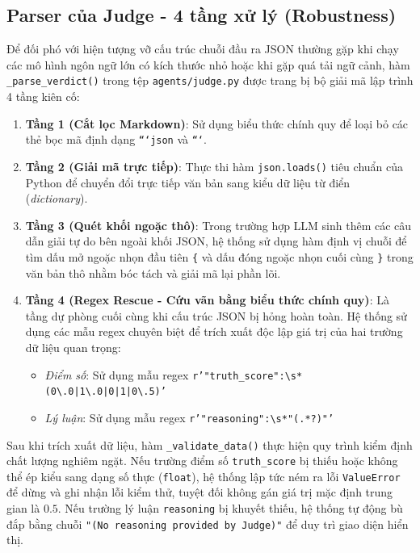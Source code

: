 \documentclass[12pt,a4paper]{report}
\begin{document}
\subsection{Parser của Judge - 4 tầng xử lý (Robustness)}
Để đối phó với hiện tượng vỡ cấu trúc chuỗi đầu ra JSON thường gặp khi chạy các mô hình ngôn ngữ lớn có kích thước nhỏ hoặc khi gặp quá tải ngữ cảnh, hàm \texttt{\_parse\_verdict()} trong tệp \texttt{agents/judge.py} được trang bị bộ giải mã lập trình 4 tầng kiên cố:
\begin{enumerate}
    \item \textbf{Tầng 1 (Cắt lọc Markdown)}: Sử dụng biểu thức chính quy để loại bỏ các thẻ bọc mã định dạng \texttt{```json} và \texttt{```}.
    \item \textbf{Tầng 2 (Giải mã trực tiếp)}: Thực thi hàm \texttt{json.loads()} tiêu chuẩn của Python để chuyển đổi trực tiếp văn bản sang kiểu dữ liệu từ điển (\textit{dictionary}).
    \item \textbf{Tầng 3 (Quét khối ngoặc thô)}: Trong trường hợp LLM sinh thêm các câu dẫn giải tự do bên ngoài khối JSON, hệ thống sử dụng hàm định vị chuỗi để tìm dấu mở ngoặc nhọn đầu tiên \texttt{\{} và dấu đóng ngoặc nhọn cuối cùng \texttt{\}} trong văn bản thô nhằm bóc tách và giải mã lại phần lõi.
    \item \textbf{Tầng 4 (Regex Rescue - Cứu vãn bằng biểu thức chính quy)}: Là tầng dự phòng cuối cùng khi cấu trúc JSON bị hỏng hoàn toàn. Hệ thống sử dụng các mẫu regex chuyên biệt để trích xuất độc lập giá trị của hai trường dữ liệu quan trọng:
    \begin{itemize}
        \item \textit{Điểm số}: Sử dụng mẫu regex \texttt{r'"truth\_score":\textbackslash{}s*(0\textbackslash{}.0|1\textbackslash{}.0|0|1|0\textbackslash{}.5)'}
        \item \textit{Lý luận}: Sử dụng mẫu regex \texttt{r'"reasoning":\textbackslash{}s*"(.*?)"'}
    \end{itemize}
\end{enumerate}

Sau khi trích xuất dữ liệu, hàm \texttt{\_validate\_data()} thực hiện quy trình kiểm định chất lượng nghiêm ngặt. Nếu trường điểm số \texttt{truth\_score} bị thiếu hoặc không thể ép kiểu sang dạng số thực (\texttt{float}), hệ thống lập tức ném ra lỗi \texttt{ValueError} để dừng và ghi nhận lỗi kiểm thử, tuyệt đối không gán giá trị mặc định trung gian là $0.5$. Nếu trường lý luận \texttt{reasoning} bị khuyết thiếu, hệ thống tự động bù đắp bằng chuỗi \texttt{"(No reasoning provided by Judge)"} để duy trì giao diện hiển thị.
\end{document}
